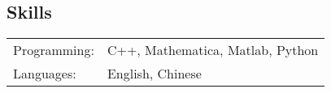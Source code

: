 \documentclass[margin,line,pifont,palatino,courier]{res}
\newenvironment{list1}{
  \begin{list}{\ding{113}}{%
      \setlength{\itemsep}{0in}
      \setlength{\parsep}{0in} \setlength{\parskip}{0in}
      \setlength{\topsep}{0in} \setlength{\partopsep}{0in}
      \setlength{\leftmargin}{0.17in}}}{\end{list}}
\begin{document}
\begin{resume}
\section{\sc Skills}

\begin{tabular}{@{}p{0.8in}p{6in}}
	Programming: &  C++, Mathematica, Matlab, Python\\
	Languages:& English, Chinese
\end{tabular}

%



\end{resume}
\end{document}
